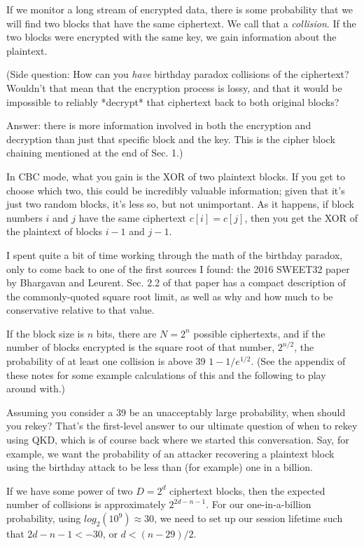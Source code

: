 \documentclass[%
 aip,
 jmp,%
 amsmath,amssymb,
 reprint,%
]{revtex4-1}
\begin{document}
If we monitor a long stream of encrypted data, there is some
probability that we will find two blocks that have the same
ciphertext.  We call that a \emph{collision}.  If the two blocks were
encrypted with the same key, we gain information about the plaintext.

(Side question: How can you \emph{have} birthday paradox collisions of the
ciphertext?  Wouldn't that mean that the encryption process is lossy,
and that it would be impossible to reliably *decrypt* that ciphertext
back to both original blocks?

Answer: there is more information involved in both the encryption and
decryption than just that specific block and the key.  This is the
cipher block chaining mentioned at the end of Sec. 1.)

In CBC mode, what you gain is the XOR of two plaintext blocks.  If you
get to choose which two, this could be incredibly valuable
information; given that it's just two random blocks, it's less so, but
not unimportant.  As it happens, if block numbers $i$ and $j$ have the
same ciphertext $c[i] = c[j]$, then you get the XOR of the plaintext of
blocks $i-1$ and $j-1$.

I spent quite a bit of time working through the math of the birthday
paradox, only to come back to one of the first sources I found: the
2016 SWEET32 paper by Bhargavan and Leurent.  Sec. 2.2 of that paper
has a compact description of the commonly-quoted square root limit, as
well as why and how much to be conservative relative to that value.

If the block size is $n$ bits, there are $N = 2^n$ possible
ciphertexts, and if the number of blocks encrypted is the square root
of that number, $2^{n/2}$, the probability of at least one collision
is above 39%
$1-1/e^{1/2}$.  (See the appendix of these notes for some example
calculations of this and the following to play around with.)

Assuming you consider a 39%
be an unacceptably large probability, when should you rekey?  That's
the first-level answer to our ultimate question of when to rekey using
QKD, which is of course back where we started this conversation.  Say,
for example, we want the probability of an attacker recovering a
plaintext block using the birthday attack to be less than (for
example) one in a billion.

If we have some power of two $D = 2^d$ ciphertext blocks, then the
expected number of collisions is approximately $2^{2d-n-1}$.  For our
one-in-a-billion probability, using $log_2(10^9) \approx 30$, we need
to set up our session lifetime such that $2d-n-1 < -30$, or $d <
(n-29)/2$.
\end{document}
